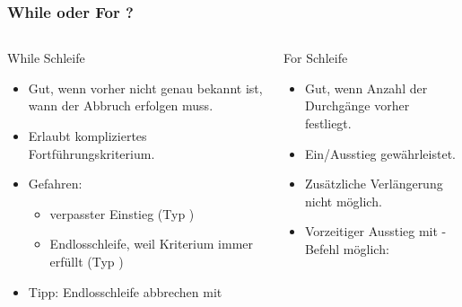       \begin{frame}
          \frametitle{While oder For ?}
          \begin{columns}[t]
            \begin{column}{5cm}
              While Schleife
              \begin{itemize}
                \item Gut, wenn vorher nicht genau bekannt ist, wann der Abbruch erfolgen muss.
                \item Erlaubt kompliziertes Fortführungskriterium.
                \item \alert{Gefahren}:
                \begin{itemize}
                  \item verpasster Einstieg (Typ )
                  \item Endlosschleife, weil Kriterium immer erfüllt (Typ )
                \end{itemize}
                \item Tipp: Endlosschleife abbrechen mit 
              \end{itemize}
            \end{column}

            \begin{column}{6cm}
              For Schleife
              \begin{itemize}
                \item Gut, wenn Anzahl der Durchgänge vorher festliegt.
                \item Ein/Ausstieg gewährleistet.
                \item Zusätzliche Verlängerung nicht möglich.
                \item Vorzeitiger Ausstieg mit -Befehl möglich:
                
              \end{itemize}
            \end{column}
          \end{columns}
      \end{frame}

